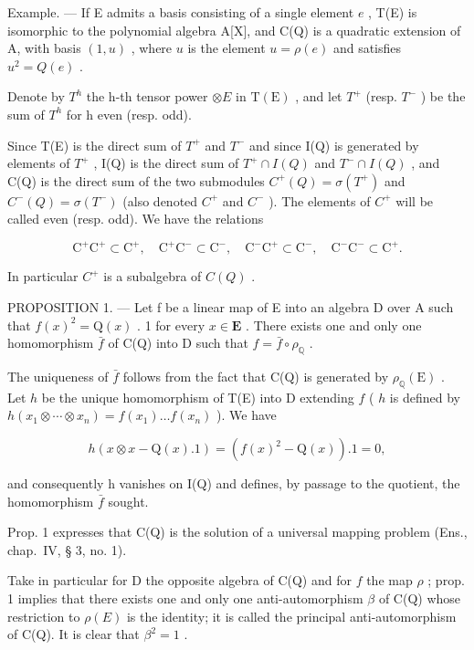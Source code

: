 Example. --- If E admits a basis consisting of a single element \(e\) , T(E) is isomorphic to the polynomial algebra A{[}X{]}, and C(Q) is a quadratic extension of A, with basis \((1, u)\) , where \(u\) is the element \(u = \rho(e)\) and satisfies \(u^2 = Q(e)\) .

Denote by \(T^{h}\) the h-th tensor power \(\otimes E\) in \(\mathrm{T}(\mathrm{E})\) , and let \(T^{+}\) (resp. \(T^{-}\) ) be the sum of \(T^{h}\) for h even (resp. odd).

Since T(E) is the direct sum of \(T^{+}\) and \(T^{-}\) and since I(Q) is generated by elements of \(T^{+}\) , I(Q) is the direct sum of \(T^{+} \cap I(Q)\) and \(T^{-} \cap I(Q)\) , and C(Q) is the direct sum of the two submodules \(C^{+}(Q) = \sigma(T^{+})\) and \(C^{-}(Q) = \sigma(T^{-})\) (also denoted \(C^{+}\) and \(C^{-}\) ). The elements of \(C^{+}\) will be called even (resp. odd). We have the relations

\[
\mathrm{C} ^ {+} \mathrm{C} ^ {+} \subset \mathrm{C} ^ {+}, \quad \mathrm{C} ^ {+} \mathrm{C} ^ {-} \subset \mathrm{C} ^ {-}, \quad \mathrm{C} ^ {-} \mathrm{C} ^ {+} \subset \mathrm{C} ^ {-}, \quad \mathrm{C} ^ {-} \mathrm{C} ^ {-} \subset \mathrm{C} ^ {+}.\tag{3}
\]

In particular \(C^{+}\) is a subalgebra of \(C(Q)\) .

PROPOSITION 1. --- Let f be a linear map of E into an algebra D over A such that \(f(x)^{2} = \mathrm{Q}(x)\) . 1 for every \(x \in \mathbf{E}\) . There exists one and only one homomorphism \(\bar{f}\) of C(Q) into D such that \(f = \bar{f} \circ \rho_{\mathbb{Q}}\) .

The uniqueness of \(\bar{f}\) follows from the fact that C(Q) is generated by \(\rho_{\mathbb{Q}}(\mathrm{E})\) . Let \(h\) be the unique homomorphism of T(E) into D extending \(f\) ( \(h\) is defined by \(h(x_1 \otimes \cdots \otimes x_n) = f(x_1) \ldots f(x_n)\) ). We have

\[
h (x \otimes x - \mathrm{Q} (x). 1) = (f (x) ^ {2} - \mathrm{Q} (x)). 1 = 0,
\]

and consequently h vanishes on I(Q) and defines, by passage to the quotient, the homomorphism \(\bar{f}\) sought.

Prop. 1 expresses that C(Q) is the solution of a universal mapping problem (Ens., chap.~IV, § 3, no. 1).

Take in particular for D the opposite algebra of C(Q) and for \(f\) the map \(\rho\) ; prop. 1 implies that there exists one and only one anti-automorphism \(\beta\) of C(Q) whose restriction to \(\rho(E)\) is the identity; it is called the principal anti-automorphism of C(Q). It is clear that \(\beta^{2} = 1\) .


